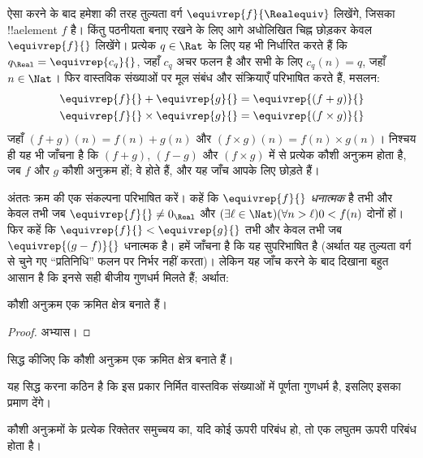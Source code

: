 \documentclass[../../../include/open-logic-section]{subfiles}
\begin{document}
ऐसा करने के बाद हमेशा की तरह तुल्यता वर्ग $\equivrep{f}{\Realequiv}$ लिखेंगे,
जिसका !!a{element} $f$ है। किंतु पठनीयता बनाए रखने के लिए आगे
अधोलिखित चिह्न छोड़कर केवल $\equivrep{f}{}$ लिखेंगे। प्रत्येक $q \in \Rat$
के लिए यह भी निर्धारित करते हैं कि $q_{\Real} = \equivrep{c_{q}}{}$, जहाँ
$c_{q}$ अचर फलन है और सभी के लिए $c_q(n) = q$, जहाँ $n \in \Nat$। फिर वास्तविक
संख्याओं पर मूल संबंध और संक्रियाएँ परिभाषित करते हैं, मसलन:
\begin{align*}
	\equivrep{f}{} + \equivrep{g}{} &= 	\equivrep{(f + g)}{} \\
	\equivrep{f}{} \times 	\equivrep{g}{} &= \equivrep{(f \times g)}{} 
\end{align*}
जहाँ $(f + g)(n) = f(n) + g(n)$ और $(f \times g)(n) = f(n) \times
g(n)$। निश्चय ही यह भी जाँचना है कि $(f + g)$, $(f-g)$ और $(f\times g)$ में
से प्रत्येक कौशी अनुक्रम होता है, जब $f$ और $g$ कौशी अनुक्रम हों;
वे होते हैं, और यह जाँच आपके लिए छोड़ते हैं।

अंततः क्रम की एक संकल्पना परिभाषित करें। कहें कि $\equivrep{f}{}$
\emph{धनात्मक} है तभी और केवल तभी जब $\equivrep{f}{}\neq 0_\Real$ और
$(\exists
\ell \in \Nat)(\forall n > \ell)0 < f(n)$ दोनों हों। फिर कहें कि
$\equivrep{f}{} <
\equivrep{g}{}$ तभी और केवल तभी जब $\equivrep{(g - f)}{}$ धनात्मक है। हमें
जाँचना है कि यह सुपरिभाषित है (अर्थात यह तुल्यता वर्ग से चुने गए ``प्रतिनिधि''
फलन पर निर्भर नहीं करता)।
लेकिन यह जाँच करने के बाद दिखाना बहुत आसान है कि इनसे सही बीजीय गुणधर्म
मिलते हैं; अर्थात:
\begin{thm}
कौशी अनुक्रम एक क्रमित क्षेत्र बनाते हैं।
\end{thm}

\begin{proof}
अभ्यास।
\end{proof}

\begin{prob}
सिद्ध कीजिए कि कौशी अनुक्रम एक क्रमित क्षेत्र बनाते हैं।
\end{prob}

यह सिद्ध करना कठिन है कि इस प्रकार निर्मित वास्तविक संख्याओं में पूर्णता
गुणधर्म है, इसलिए इसका प्रमाण देंगे।

\begin{thm}
कौशी अनुक्रमों के प्रत्येक रिक्तेतर समुच्चय का, यदि कोई ऊपरी परिबंध हो, तो एक
लघुतम ऊपरी परिबंध होता है।
\end{thm}
\end{document}
